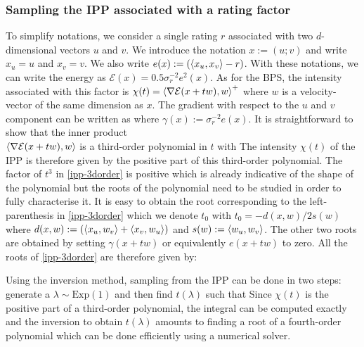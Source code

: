 \subsubsection{Sampling the IPP associated with a rating factor}

To simplify notations, we consider a single rating $r$ associated with two $d$-dimensional vectors $u$ and $v$. We introduce the notation $x:=(u; v)$ and write $x_{u}=u$ and $x_{v}=v$. We also write $e(x):=(\left\langle x_{u},x_{v} \right\rangle-r)$. With these notations, we can write the energy as $\mathcal E(x) = 0.5\sigma_{r}^{-2}e^{2}(x)$. 
As for the BPS, the intensity associated with this factor is $\chi(t) = \left\langle \nabla \mathcal E(x+tw), w \right\rangle^{+}$ where $w$ is a velocity-vector of the same dimension as $x$. The gradient with respect to the $u$ and $v$ component can be written as
where $\gamma(x):=\sigma_{r}^{-2}e(x)$. It is straightforward to show that the inner product \\$\left\langle \nabla\mathcal E(x+tw), w \right\rangle$ is a third-order polynomial in $t$ with
The intensity $\chi(t)$ of the IPP is therefore given by the positive part of this third-order polynomial. The factor of $t^{3}$ in \eqref{ipp-3dorder} is positive which is already indicative of the shape of the polynomial but the roots of the polynomial need to be studied in order to fully characterise it. It is easy to obtain the root corresponding to the left-parenthesis in \eqref{ipp-3dorder} which we denote $t_{0}$ with $t_{0}=-d(x,w)/2s(w)$ where $d(x,w):=(\left\langle x_{u}, w_{v} \right\rangle+\left\langle x_{v},w_{u} \right\rangle)$ and $s(w):=\left\langle w_{u},w_{v} \right\rangle$. The other two roots are obtained by setting $\gamma(x+tw)$ or equivalently $e(x+tw)$ to zero. All the roots of \eqref{ipp-3dorder} are therefore given by:

Using the inversion method, sampling from the IPP can be done in two steps: generate a $\lambda\sim\mathrm{Exp}(1)$ and then find $t(\lambda)$ such that
Since $\chi(t)$ is the positive part of a third-order polynomial, the integral can be computed exactly and the inversion to obtain $t(\lambda)$ amounts to finding a root of a fourth-order polynomial which can be done efficiently using a numerical solver. 

